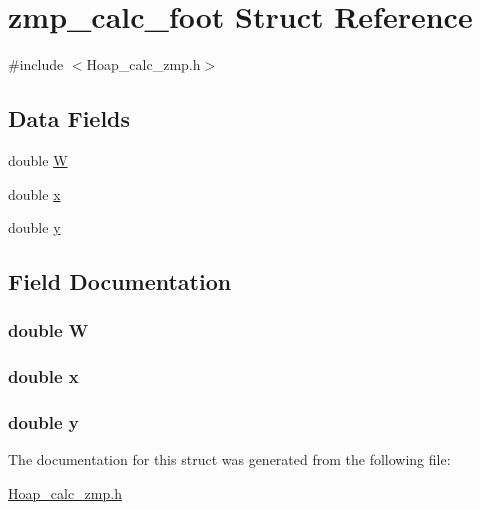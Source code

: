 \hypertarget{structzmp__calc__foot}{\section{zmp\-\_\-calc\-\_\-foot Struct Reference}
\label{structzmp__calc__foot}
}


{\ttfamily \#include $<$Hoap\-\_\-calc\-\_\-zmp.\-h$>$}

\subsection*{Data Fields}
\begin{DoxyCompactItemize}
\item 
double \hyperlink{structzmp__calc__foot_a5ec511930edd29ba1a84430964cf60cd}{W}
\item 
double \hyperlink{structzmp__calc__foot_af88b946fb90d5f08b5fb740c70e98c10}{x}
\item 
double \hyperlink{structzmp__calc__foot_ab927965981178aa1fba979a37168db2a}{y}
\end{DoxyCompactItemize}


\subsection{Field Documentation}
\hypertarget{structzmp__calc__foot_a5ec511930edd29ba1a84430964cf60cd}{
\subsubsection[{W}]{\setlength{\rightskip}{0pt plus 5cm}double W}}\label{structzmp__calc__foot_a5ec511930edd29ba1a84430964cf60cd}
\hypertarget{structzmp__calc__foot_af88b946fb90d5f08b5fb740c70e98c10}{
\subsubsection[{x}]{\setlength{\rightskip}{0pt plus 5cm}double x}}\label{structzmp__calc__foot_af88b946fb90d5f08b5fb740c70e98c10}
\hypertarget{structzmp__calc__foot_ab927965981178aa1fba979a37168db2a}{
\subsubsection[{y}]{\setlength{\rightskip}{0pt plus 5cm}double y}}\label{structzmp__calc__foot_ab927965981178aa1fba979a37168db2a}


The documentation for this struct was generated from the following file\-:\begin{DoxyCompactItemize}
\item 
\hyperlink{_hoap__calc__zmp_8h}{Hoap\-\_\-calc\-\_\-zmp.\-h}\end{DoxyCompactItemize}
